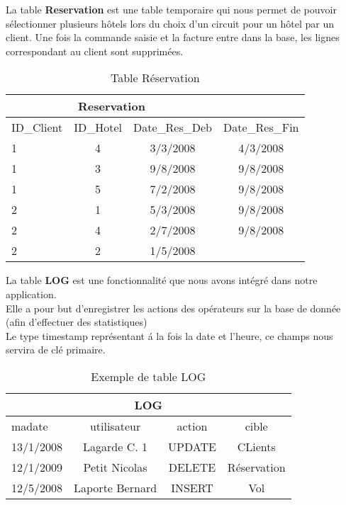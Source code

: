 \begin{table}[h]
La table \textbf{Reservation} est une table temporaire qui nous permet de pouvoir s\'electionner plusieurs h\^otels lors du choix d'un circuit pour un h\^otel par un client. Une fois la commande saisie et la facture entre dans la base, les lignes correspondant au client sont supprim\'ees.
\begin{center}
\begin{tabular}{|l|c|c|c|}
\hline
\multicolumn{3}{|c|}{Reservation}\\
\hline
ID\_Client& ID\_Hotel&Date\_Res\_Deb&Date\_Res\_Fin\\
\hline
1 & 4&3/3/2008&4/3/2008\\
\hline
1 & 3&9/8/2008&9/8/2008\\
\hline
1 & 5&7/2/2008&9/8/2008\\
\hline
2 & 1&5/3/2008&9/8/2008\\
\hline
2&4&2/7/2008&9/8/2008\\
\hline
2 & 2&1/5/2008\\
\hline
\end{tabular}
\end{center}
\caption{Table R\'eservation}
\end{table}

\begin{table}[h]
 La table \textbf{LOG} est une fonctionnalit\'e que nous avons int\'egr\'e dans notre application. \\
 Elle a pour but d'enregistrer les actions des op\'erateurs sur la base de donn\'ee (afin d'effectuer des statistiques)\\
Le type timestamp repr\'esentant \'a la fois la date et l'heure, ce champs nous servira de cl\'e primaire.
\begin{center}
\begin{tabular}{|l|c|c|c|}
\hline
\multicolumn{4}{|c|}{LOG}\\
\hline
madate&utilisateur&action&cible\\
\hline
13/1/2008 &Lagarde C. 1&UPDATE&CLients\\
\hline
12/1/2009 &Petit Nicolas&DELETE&R\'eservation\\
\hline
12/5/2008 &Laporte Bernard&INSERT&Vol\\
\hline
\end{tabular}
\end{center}
\caption{Exemple de table LOG}
\end{table}
\newpage

